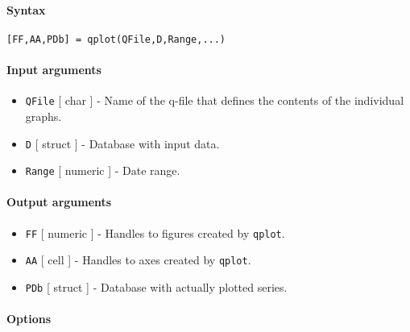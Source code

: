 


	\paragraph{Syntax}

\begin{verbatim}
[FF,AA,PDb] = qplot(QFile,D,Range,...)
\end{verbatim}

\paragraph{Input arguments}

\begin{itemize}
\item
  \texttt{QFile} {[} char {]} - Name of the q-file that defines the
  contents of the individual graphs.
\item
  \texttt{D} {[} struct {]} - Database with input data.
\item
  \texttt{Range} {[} numeric {]} - Date range.
\end{itemize}

\paragraph{Output arguments}

\begin{itemize}
\item
  \texttt{FF} {[} numeric {]} - Handles to figures created by
  \texttt{qplot}.
\item
  \texttt{AA} {[} cell {]} - Handles to axes created by \texttt{qplot}.
\item
  \texttt{PDb} {[} struct {]} - Database with actually plotted series.
\end{itemize}

\paragraph{Options}

